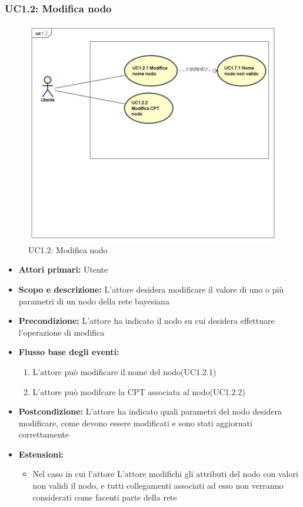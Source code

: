 \subsubsection{UC1.2: Modifica nodo} 
\begin{figure} [H]
	\centering
	\includegraphics[scale=0.45]{Img/UC1-2} 
	\caption{UC1.2: Modifica nodo} \label{} 
\end{figure} 
\begin{itemize} 
	\item{\textbf{Attori primari:} Utente} 
	\item{\textbf{Scopo e descrizione:} L'attore desidera modificare il valore di uno o più parametri di un nodo della rete bayesiana} 
	\item{\textbf{Precondizione:} L'attore ha indicato il nodo su cui desidera effettuare l'operazione di modifica} 
	\item{\textbf{Flusso base degli eventi:} } 
		\begin{enumerate} 
			\item{L'attore può modificare il nome del nodo(UC1.2.1)} 
			\item{L'attore può modifcare la CPT associata al nodo(UC1.2.2)} 		
		\end{enumerate} 
	\item{\textbf{Postcondizione:} L'attore ha indicato quali parametri del nodo desidera modificare, come devono essere modificati e sono stati aggiornati correttamente} 
	\item{\textbf{Estensioni:} } 
		\begin{itemize} 
			\item{Nel caso in cui l'attore L'attore modifichi gli attributi del nodo con valori non validi il nodo, e tutti collegamenti associati ad esso non verranno considerati come facenti parte della rete} 
		\end{itemize} 
\end{itemize} 
